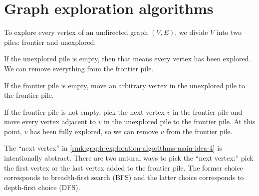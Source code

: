 \documentclass{amsart}
\begin{document}
\section{Graph exploration algorithms}
\label{sec:graph-exploration-algorithms}

\begin{rmk}
  \label{rmk:graph-exploration-algorithms-main-idea-1}
  To explore every vertex of an undirected graph $(V,E)$, we divide $V$ into two piles: frontier and unexplored.
\end{rmk}

\begin{rmk}
  \label{rmk:graph-exploration-algorithms-main-idea-2}
  If the unexplored pile is empty, then that means every vertex has been explored.
  We can remove everything from the frontier pile.
\end{rmk}

\begin{rmk}
  \label{rmk:graph-exploration-algorithms-main-idea-3}
  If the frontier pile is empty, move an arbitrary vertex in the unexplored pile to the frontier pile.
\end{rmk}

\begin{rmk}
  \label{rmk:graph-exploration-algorithms-main-idea-4}
  If the frontier pile is not empty, pick the next vertex $v$ in the frontier pile and move every vertex adjacent to $v$ in the unexplored pile to the frontier pile.
  At this point, $v$ has been fully explored, so we can remove $v$ from the frontier pile.
\end{rmk}

\begin{rmk}
  \label{rmk:graph-exploration-algorithms-next-vertex}
  The ``next vertex'' in \cref{rmk:graph-exploration-algorithms-main-idea-4} is intentionally abstract.
  There are two natural ways to pick the ``next vertex:'' pick the first vertex or the last vertex added to the frontier pile.
  The former choice corresponds to breadth-first search (BFS) and the latter choice corresponds to depth-first choice (DFS).
\end{rmk}
\end{document}
